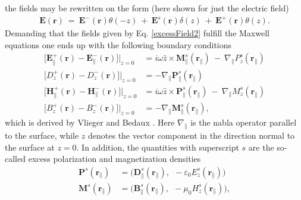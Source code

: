 the fields may be rewritten on the form (here shown for just the electric field)
%
\begin{align}
   \label{excessField2}
   \boldsymbol{E}(\boldsymbol{r}) \:=\: \boldsymbol{E}^-(\boldsymbol{r})\theta(-z) 
                                       \:+\: \boldsymbol{E}^s(\boldsymbol{r})\delta(z) 
                                       \:+\: \boldsymbol{E}^+(\boldsymbol{r})\theta(z).
\end{align}
%
Demanding that the fields given by Eq. \eqref{excessField2} fulfill the Maxwell equations 
one ends up with the following boundary conditions %
%
\begin{subequations}
   \label{exFieldBC} %
\begin{align}
   \big[ \boldsymbol{E}^+_{\parallel} (\boldsymbol{r}) - \boldsymbol{E}^-_{\parallel} (\boldsymbol{r}) \big] \bigg\rvert _{z = 0} 
       &= i \omega \hat{z} \times \! \boldsymbol{M}^s_{\parallel}(\boldsymbol{r}_{\parallel}) \:-\: \nabla\!_{\parallel} P^s_{z}(\boldsymbol{r}_{\parallel}) 
       \label{exFieldBC1} \\ 
   \big[ D^+_{z} (\boldsymbol{r}) - D^-_{z} (\boldsymbol{r}) \big] \bigg\rvert _{z = 0} 
      &= - \nabla\!_{\parallel} \boldsymbol{P}^s_{\parallel}(\boldsymbol{r}_{\parallel}) 
      \label{exFieldBC2} \\ 
   \big[ \boldsymbol{H}^+_{\parallel} (\boldsymbol{r}) - \boldsymbol{H}^-_{\parallel} (\boldsymbol{r}) \big] \bigg\rvert _{z = 0} 
      &= i \omega \hat{z} \times \! \boldsymbol{P}^s_{\parallel}(\boldsymbol{r}_{\parallel}) \:-\: \nabla\!_{\parallel} M^s_{z}(\boldsymbol{r}_{\parallel})  
      \label{exFieldBC3} \\ 
   \big[ B^+_{z} (\boldsymbol{r}) - B^-_{z} (\boldsymbol{r}) \big] \bigg\rvert _{z = 0} 
      &= - \nabla\!_{\parallel} \boldsymbol{M}^s_{\parallel}(\boldsymbol{r}_{\parallel}), 
      \label{exFieldBC4}  
\end{align}
\end{subequations}
%
which is derived by Vlieger and Bedaux \cite[p.21]{BedeauxVliegerBook}. 
Here $\nabla_{\parallel}$ is the nabla operator parallel to the surface, while $z$ denotes 
the vector component in the direction normal to the surface at $z = 0$.
In addition, the quantities with superscript $s$ are the so-called excess polarization 
and magnetization densities
\begin{subequations}
\label{surfQuant} %
\begin{align}
   \boldsymbol{P}^s(\boldsymbol{r}\!_{\parallel}) &= \big( \boldsymbol{D}^s_{\parallel}(\boldsymbol{r}\!_{\parallel}), \:\: - \varepsilon_0 E^s_{z}(\boldsymbol{r}\!_{\parallel}) \big) \label{surfQuant1}\\
   \boldsymbol{M}^s(\boldsymbol{r}\!_{\parallel}) &= \big( \boldsymbol{B}^s_{\parallel}(\boldsymbol{r}\!_{\parallel}), \:\: - \mu_0 H^s_{z}(\boldsymbol{r}\!_{\parallel}) \big) , \label{surfQuant2}
\end{align}
\end{subequations}
